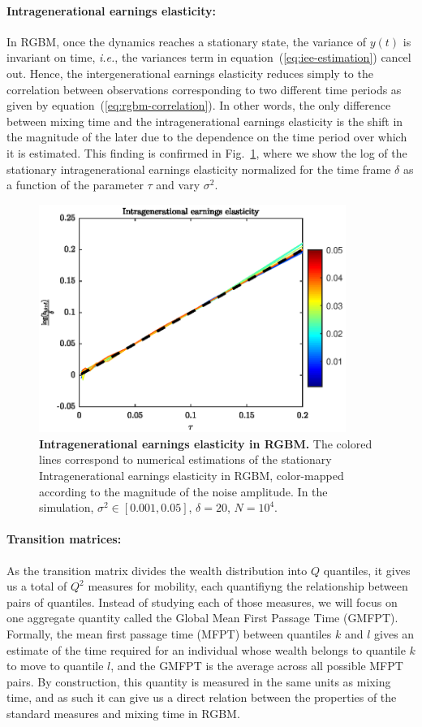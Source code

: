 \documentclass[11pt]{article}
\newcommand{\ie}{{\it i.e.}\xspace}
\numberwithin{equation}{section}
\begin{document}
\paragraph{Intragenerational earnings elasticity:} In RGBM, once the dynamics reaches a stationary state, the variance of $y(t)$ is invariant on time, \ie, the variances term in equation~(\ref{eq:iee-estimation}) cancel out. Hence, the  intergenerational earnings elasticity reduces simply to the correlation between observations corresponding to two different time periods as given by equation~(\ref{eq:rgbm-correlation}). In other words, the only difference between mixing time and the intragenerational earnings elasticity is the shift in the magnitude of the later due to the dependence on the time period over which it is estimated. This finding is confirmed in Fig.~\ref{fig:rgbm-iee}, where we show the log of the stationary intragenerational earnings elasticity normalized for the time frame $\delta$ as a function of the parameter $\tau$ and vary $\sigma^2$.

\begin{figure}[t!]
\includegraphics[width=10cm]{figs/fig_iee_rgbm.eps}
\caption{\textbf{Intragenerational earnings elasticity in RGBM.} The colored lines correspond to numerical estimations of the stationary Intragenerational earnings elasticity in RGBM, color-mapped according to the magnitude of the noise amplitude. In the simulation, $\sigma^2 \in \left[ 0.001, 0.05\right]$, $\delta = 20$, $N = 10^4$. \label{fig:rgbm-iee}}
\end{figure}

\paragraph{Transition matrices:} As the transition matrix divides the wealth distribution into $Q$ quantiles, it gives us a total of $Q^2$ measures for mobility, each quantifiyng the relationship between pairs of quantiles. Instead of studying each of those measures, we will focus on one aggregate quantity called the Global Mean First Passage Time (GMFPT). Formally, the mean first passage time (MFPT) between quantiles $k$ and $l$ gives an estimate of the time required for an individual whose wealth belongs to quantile $k$ to move to quantile $l$, and the GMFPT is the average across all possible MFPT pairs. By construction, this quantity is measured in the same units as mixing time, and as such it can give us a direct relation between the properties of the standard measures and mixing time in RGBM.
\end{document}
